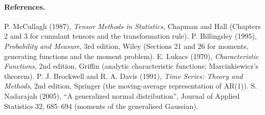\paragraph{References.}
P. McCullagh (1987), \emph{Tensor Methods in Statistics}, Chapman and Hall (Chapters 2
and 3 for cumulant tensors and the transformation rule).
P. Billingsley (1995), \emph{Probability and Measure}, 3rd edition, Wiley (Sections 21
and 26 for moments, generating functions and the moment problem).
E. Lukacs (1970), \emph{Characteristic Functions}, 2nd edition, Griffin (analytic
characteristic functions; Marcinkiewicz's theorem).
P. J. Brockwell and R. A. Davis (1991), \emph{Time Series: Theory and Methods},
2nd edition, Springer (the moving-average representation of AR(1)).
S. Nadarajah (2005), ``A generalized normal distribution'', Journal of Applied
Statistics 32, 685--694 (moments of the generalised Gaussian).
